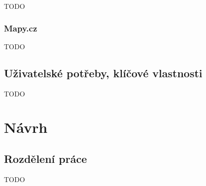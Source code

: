 \documentclass{article}
\begin{document}
TODO

\subsubsection{Mapy.cz}
TODO

\subsection{Uživatelské potřeby, klíčové vlastnosti}

TODO

\section{Návrh}

\subsection{Rozdělení práce}

TODO
\end{document}

